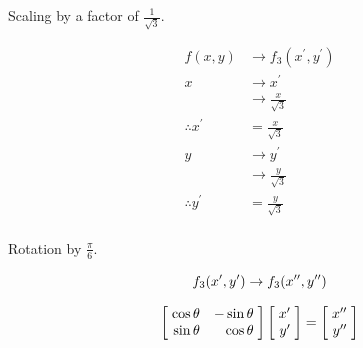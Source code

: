 \documentclass[a4paper]{article}
\begin{document}
\begin{enumerate}[label=\textbf{\arabic*.}]
\begin{enumerate}
		\bigbreak

		\begin{center}
		Scaling by a factor of $\frac{1}{\sqrt{3}}$.
		\end{center}

		\begin{align*}
		f(x,y) & \rightarrow f_3(x^{\prime},y^{\prime})\\
		x & \rightarrow x^{\prime}\\
		& \rightarrow \frac{x}{\sqrt{3}}\\
		\therefore x^{\prime} & = \frac{x}{\sqrt{3}}\\
		y & \rightarrow y^{\prime}\\
		& \rightarrow \frac{y}{\sqrt{3}}\\
		\therefore y^{\prime} & = \frac{y}{\sqrt{3}}\\
		\end{align*}

		\pagebreak

		\begin{center}
		Rotation by $\frac{\pi}{6}$.
		\end{center}

		\begin{equation*}
		f_3(x^{\prime},y^{\prime}) \rightarrow f_3(x^{\prime \prime},y^{\prime \prime})\\
		\end{equation*}

		\begin{equation*}
		\begin{bmatrix*}[r]
			\hspace{1mm} \cos{\theta} & -\sin{\theta} \hspace{1mm}\\
			\hspace{1mm} \sin{\theta} & \cos{\theta} \hspace{1mm}\\
		\end{bmatrix*}
		\begin{bmatrix*}[r]
			\hspace{1mm} x^{\prime} \hspace{1mm}\\
			\hspace{1mm} y^{\prime} \hspace{1mm}\\
		\end{bmatrix*}
		=
		\begin{bmatrix*}[r]
			\hspace{1mm} x^{\prime \prime} \hspace{1mm}\\
			\hspace{1mm} y^{\prime \prime} \hspace{1mm}\\
		\end{bmatrix*}
		\end{equation*}


\end{enumerate}
\end{enumerate}
\end{document}
